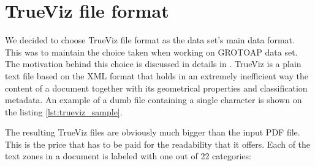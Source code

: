 \section{TrueViz file format}
We decided to choose TrueViz file format as the data set's main data format. This was to maintain the choice taken when working on GROTOAP data set. The motivation behind this choice is discussed in details in \cite{Tkaczyk2012}. TrueViz is a plain text file based on the XML format that holds in an extremely inefficient way the content of a document together with its geometrical properties and classification metadata. An example of a dumb file containing a single character is shown on the listing \ref{lst:trueviz_sample}.

The resulting TrueViz files are obviously much bigger than the input PDF file. This is the price that has to be paid for the readability that it offers.
\quad
Each of the text zones in a document is labeled with one out of 22 categories:

